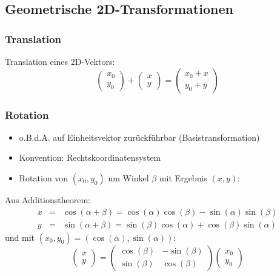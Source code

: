 \subsection{Geometrische 2D-Transformationen}

\subsubsection*{Translation}

Translation eines 2D-Vektors: $$\left( \begin{array}{c} x_0 \\ y_0 \end{array} \right) + \left( \begin{array}{c} x \\ y \end{array} \right) = \left( \begin{array}{c} x_0 + x \\ y_0 + y \end{array} \right)$$

\subsubsection*{Rotation}

\begin{itemize}
\item o.B.d.A. auf Einheitsvektor zurückführbar (Basistransformation)
\item Konvention: Rechtskoordinatensystem
\item Rotation von $(x_0,y_0)$ um Winkel $\beta$ mit Ergebnis $(x,y)$:
\end{itemize}
Aus Additionstheorem:
\begin{eqnarray*}
x &=& \cos(\alpha + \beta) = \cos(\alpha) \cos(\beta) - \sin(\alpha) \sin(\beta) \\ y &=& \sin(\alpha + \beta) = \sin(\beta) \cos(\alpha) + \cos(\beta) \sin(\alpha)
\end{eqnarray*}
und mit $(x_0,y_0) = (\cos(\alpha), \sin(\alpha))$:
$$\left( \begin{array}{c} x \\ y \end{array} \right) = \left( \begin{array}{rr} \cos(\beta) & -\sin(\beta) \\ \sin(\beta) & \cos(\beta) \end{array} \right) \left( \begin{array}{c} x_0 \\ y_0 \end{array} \right)$$


